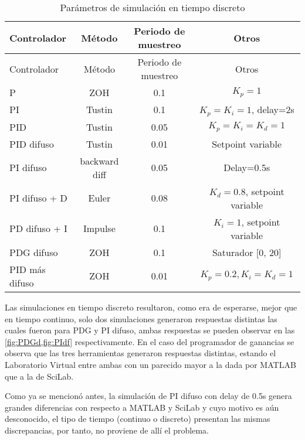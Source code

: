         {\setlength\LTleft{0pt}
        \setlength\LTright{0pt}
        \centering
        \footnotesize
        \renewcommand{\arraystretch}{0.89}
        \begin{longtable}{l @{\extracolsep{\fill}} ccc}
            \caption[Parámetros de simulación en tiempo discreto]{Parámetros de simulación en tiempo discreto} 
            \label{tab:parametrosD} \\
            \toprule
            Controlador  & Método & Periodo de muestreo & Otros       \\ \midrule
            \endfirsthead
            \toprule
            Controlador  & Método & Periodo de muestreo & Otros       \\ \midrule
            \endhead
            \bottomrule
            \endfoot
            P              & ZOH           & 0.1  & $K_p=1$                      \\
            PI             & Tustin        & 0.1  & $K_p=K_i=1$, delay=2s        \\
            PID            & Tustin        & 0.05 & $K_p=K_i=K_d=1$              \\
            PID difuso     & Tustin        & 0.01 & Setpoint variable            \\
            PI difuso      & backward diff & 0.05 & Delay=0.5s                   \\
            PI difuso + D  & Euler         & 0.08 & $K_d=0.8$, setpoint variable \\
            PD difuso + I  & Impulse       & 0.1  & $K_i=1$, setpoint variable   \\
            PDG difuso     & ZOH           & 0.1  & Saturador [0, 20]            \\
            PID más difuso & ZOH           & 0.01 & $K_p=0.2, K_i=K_d=1$         \\
        \end{longtable}}

        Las simulaciones en tiempo discreto resultaron, como era de esperarse, mejor que en tiempo continuo, solo dos simulaciones generaron respuestas distintas las cuales fueron para PDG y PI difuso, ambas respuestas se pueden observar en las \cref{fig:PDGd,fig:PIdf} respectivamente. En el caso del programador de ganancias se observa que las tres herramientas generaron respuestas distintas, estando el Laboratorio Virtual entre ambas con un parecido mayor a la dada por MATLAB que a la de SciLab.

        Como ya se mencionó antes, la simulación de PI difuso con delay de 0.5s genera grandes diferencias con respecto a MATLAB y SciLab y cuyo motivo es aún desconocido, el tipo de tiempo (continuo o discreto) presentan las mismas discrepancias, por tanto, no proviene de allí el problema.

